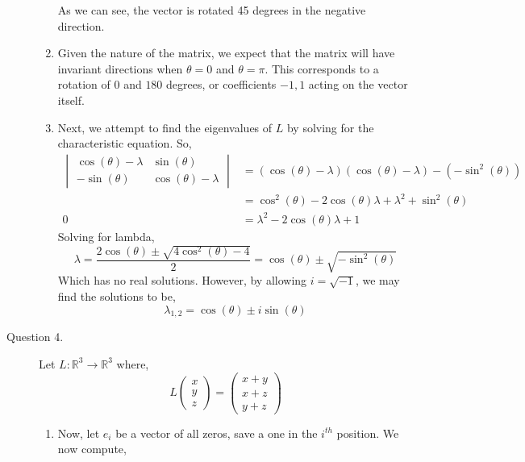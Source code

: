 \documentclass[letterpaper,10pt]{article}
\newcommand{\R}{\mathbb{R}}
\begin{document}
\begin{description}
\begin{enumerate}[label=\alph*.]
\begin{center}
\end{center}
As we can see, the vector is rotated 45 degrees in the negative direction.
\item Given the nature of the matrix, we expect that the matrix will have invariant directions when $\theta=0$ and $\theta=\pi$. This corresponds to a rotation of $0$ and $180$ degrees, or coefficients $-1,1$ acting on the vector itself.
\item Next, we attempt to find the eigenvalues of $L$ by solving for the characteristic equation. So,
\begin{align*}
\begin{vmatrix}
\cos(\theta)-\lambda & \sin(\theta)\\ -\sin(\theta) & \cos(\theta)-\lambda
\end{vmatrix} &= (\cos(\theta)-\lambda)(\cos(\theta)-\lambda)-(-\sin^2(\theta))\\
&=\cos^2(\theta)-2\cos(\theta)\lambda+\lambda^2+\sin^2(\theta)\\
0&=\lambda^2-2\cos(\theta)\lambda+1
\end{align*}
Solving for lambda, 
\[\lambda=\frac{2\cos(\theta)\pm\sqrt{4\cos^2(\theta)-4}}{2}=\cos(\theta)\pm\sqrt{-\sin^2(\theta)}\]
Which has no real solutions. However, by allowing $i=\sqrt{-1}$, we may find the solutions to be,
\[\lambda_{1,2}=\cos(\theta)\pm i\sin(\theta)\]
\end{enumerate}
\item[Question 4.] Let $L:\R^3\to \R^3$ where,
\[L\begin{pmatrix}
x\\y\\z
\end{pmatrix}=\begin{pmatrix}
x+y\\x+z\\y+z
\end{pmatrix} \]
\begin{enumerate}[label=\alph*.]
\item Now, let $e_i$ be a vector of all zeros, save a one in the $i^{th}$ position. We now compute,
\begin{align*}

\end{align*}
\end{enumerate}
\end{description}
\end{document}
